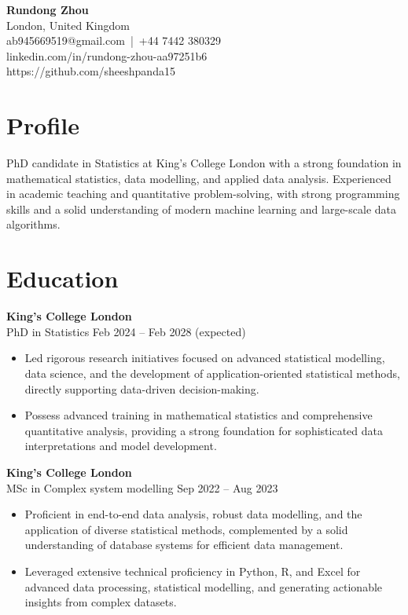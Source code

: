 \documentclass[11pt,a4paper]{article}
\begin{document}
\begin{center}
{\LARGE \textbf{Rundong Zhou}} \\[-2pt]
London, United Kingdom \\[-2pt]
{ab945669519@gmail.com} \,|\, +44 7442 380329 \\[-2pt]
{linkedin.com/in/rundong-zhou-aa97251b6}\\[-2pt]
{https://github.com/sheeshpanda15}
\end{center}

\vspace{0.3cm}

\section*{Profile}
PhD candidate in Statistics at King’s College London with a strong foundation in mathematical statistics,
data modelling, and applied data analysis. Experienced in academic teaching and quantitative problem-solving,
with strong programming skills and a solid understanding of modern machine learning and large-scale data algorithms.

\section*{Education}

\quad \textbf{King’s College London} \\
PhD in Statistics \hfill Feb 2024 -- Feb 2028 (expected)
\begin{itemize}
\item Led rigorous research initiatives focused on advanced statistical modelling, data science, and the development of application-oriented statistical methods, directly supporting data-driven decision-making.
\item Possess advanced training in mathematical statistics and comprehensive quantitative analysis, providing a strong foundation for sophisticated data interpretations and model development.
\end{itemize}

\textbf{King’s College London} \\
MSc in Complex system modelling \hfill Sep 2022 -- Aug 2023
\begin{itemize}
\item Proficient in end-to-end data analysis, robust data modelling, and the application of diverse statistical methods, complemented by a solid understanding of database systems for efficient data management.
\item Leveraged extensive technical proficiency in Python, R, and Excel for advanced data processing, statistical modelling, and generating actionable insights from complex datasets.
\end{itemize}
\end{document}
